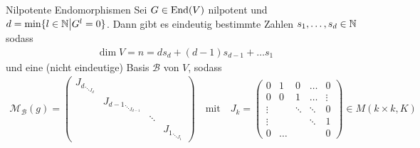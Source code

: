     \begin{satz}{Nilpotente Endomorphismen}
        Sei $G \in \operatorname{End}(V)$ nilpotent und $d = \min \{l \in \mathbb{N} \big\vert G^l = 0\}$. Dann gibt es eindeutig bestimmte Zahlen $s_1, \ldots, s_d \in \mathbb{N}$ sodass
        \begin{align*}
            \dim V = n = d s_d + (d-1) s_{d-1} + \ldots s_1
        \end{align*} 
        und eine (nicht eindeutige) Basis $\mathcal{B}$ von $V$, sodass
        \begin{align*}
            \mathcal{M}_{\mathcal{B}}(g) = \begin{pmatrix}
                {J_d}_{\ddots_{ J_d}}\\
                & {J_{d-1}}_{\ddots_{J_{d-1}}}\\
                & & \ddots \\
                & & & {J_1}_{\ddots_{J_1}}
            \end{pmatrix}
            \quad \text{mit} \quad
                J_k = \begin{pmatrix}
                    0 & 1 & 0 & \dots & 0\\
                    0 & 0 & 1 & \dots & \vdots\\
                    \vdots & & \ddots & \ddots & 0\\
                    \vdots & & & \ddots & 1\\
                    0 & \dots & & & 0
                \end{pmatrix} \in M(k\times k,K)
    \end{align*}
\end{satz}






